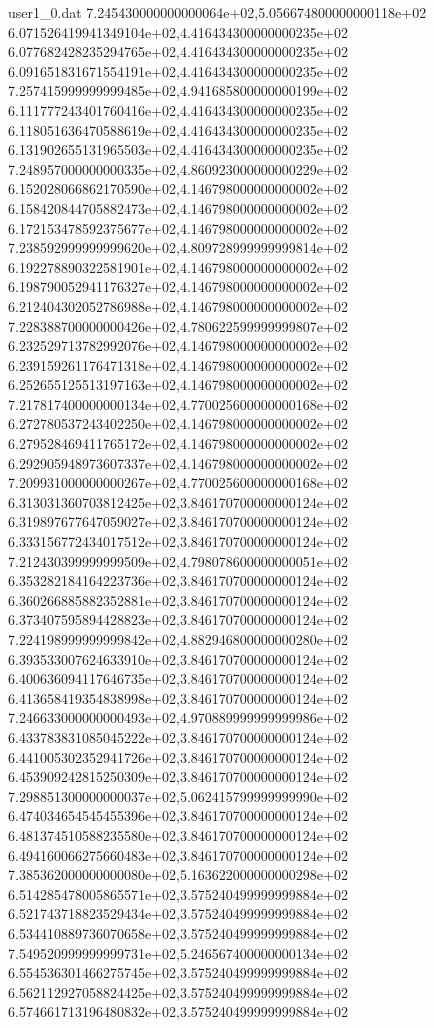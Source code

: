\begin{filecontents}{user1_0.dat}
7.245430000000000064e+02,5.056674800000000118e+02
6.071526419941349104e+02,4.416434300000000235e+02
6.077682428235294765e+02,4.416434300000000235e+02
6.091651831671554191e+02,4.416434300000000235e+02
7.257415999999999485e+02,4.941685800000000199e+02
6.111777243401760416e+02,4.416434300000000235e+02
6.118051636470588619e+02,4.416434300000000235e+02
6.131902655131965503e+02,4.416434300000000235e+02
7.248957000000000335e+02,4.860923000000000229e+02
6.152028066862170590e+02,4.146798000000000002e+02
6.158420844705882473e+02,4.146798000000000002e+02
6.172153478592375677e+02,4.146798000000000002e+02
7.238592999999999620e+02,4.809728999999999814e+02
6.192278890322581901e+02,4.146798000000000002e+02
6.198790052941176327e+02,4.146798000000000002e+02
6.212404302052786988e+02,4.146798000000000002e+02
7.228388700000000426e+02,4.780622599999999807e+02
6.232529713782992076e+02,4.146798000000000002e+02
6.239159261176471318e+02,4.146798000000000002e+02
6.252655125513197163e+02,4.146798000000000002e+02
7.217817400000000134e+02,4.770025600000000168e+02
6.272780537243402250e+02,4.146798000000000002e+02
6.279528469411765172e+02,4.146798000000000002e+02
6.292905948973607337e+02,4.146798000000000002e+02
7.209931000000000267e+02,4.770025600000000168e+02
6.313031360703812425e+02,3.846170700000000124e+02
6.319897677647059027e+02,3.846170700000000124e+02
6.333156772434017512e+02,3.846170700000000124e+02
7.212430399999999509e+02,4.798078600000000051e+02
6.353282184164223736e+02,3.846170700000000124e+02
6.360266885882352881e+02,3.846170700000000124e+02
6.373407595894428823e+02,3.846170700000000124e+02
7.224198999999999842e+02,4.882946800000000280e+02
6.393533007624633910e+02,3.846170700000000124e+02
6.400636094117646735e+02,3.846170700000000124e+02
6.413658419354838998e+02,3.846170700000000124e+02
7.246633000000000493e+02,4.970889999999999986e+02
6.433783831085045222e+02,3.846170700000000124e+02
6.441005302352941726e+02,3.846170700000000124e+02
6.453909242815250309e+02,3.846170700000000124e+02
7.298851300000000037e+02,5.062415799999999990e+02
6.474034654545455396e+02,3.846170700000000124e+02
6.481374510588235580e+02,3.846170700000000124e+02
6.494160066275660483e+02,3.846170700000000124e+02
7.385362000000000080e+02,5.163622000000000298e+02
6.514285478005865571e+02,3.575240499999999884e+02
6.521743718823529434e+02,3.575240499999999884e+02
6.534410889736070658e+02,3.575240499999999884e+02
7.549520999999999731e+02,5.246567400000000134e+02
6.554536301466275745e+02,3.575240499999999884e+02
6.562112927058824425e+02,3.575240499999999884e+02
6.574661713196480832e+02,3.575240499999999884e+02

\end{filecontents}
